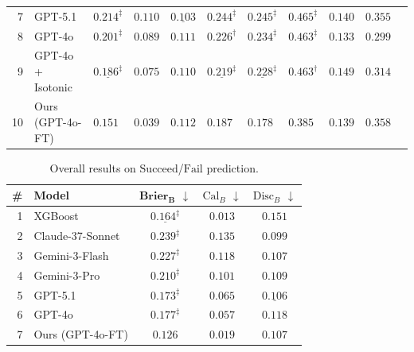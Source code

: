 \documentclass{article}
\theoremstyle{plain}
\theoremstyle{definition}
\theoremstyle{remark}
\newcommand{\Succeed}{\boldsymbol{\mathrm{Succeed}}}
\newcommand{\Fail}{\boldsymbol{\mathrm{Fail}}}
\begin{document}
\begin{table}[t]
\begin{tabularx}{\textwidth}{@{} r X lllllllcc @{}}
7 & GPT-5.1 & $0.214^{\ddagger}$ & $0.110$ & $\underline{0.103}$ & $0.244^{\ddagger}$ & $0.245^{\ddagger}$ & $0.465^{\ddagger}$ & $0.140$ & $0.355$ \\
8 & GPT-4o & $0.201^{\ddagger}$ & $0.089$ & $0.111$ & ${0.226^{\dagger}}$ & ${0.234^{\ddagger}}$ & $0.463^{\ddagger}$ & $0.133$ & $0.299$ \\
9 & GPT-4o + Isotonic & $\underline{0.186^{\ddagger}}$ & $0.075$ & $0.110$ & $\underline{0.219^{\ddagger}}$ & $\underline{0.228^{\ddagger}}$ & $0.463^{\dagger}$ & $0.149$ & $0.314$ \\
10 & Ours (GPT-4o-FT) & $\mathbf{0.151}$ & $0.039$ & $0.112$ & $\mathbf{0.187}$ & $\mathbf{0.178}$ & $\mathbf{0.385}$ & $0.139$ & $0.358$ \\

\bottomrule

\end{tabularx}
\end{table}

\begin{table}[t]
\caption{Overall results on $\Succeed$/$\Fail$ prediction.}
\label{tab:evaluation-metrics-completion}
\centering
\small
\begin{tabularx}{\columnwidth}{@{} r X ccc @{}}
\toprule
\textbf{\#}  & \textbf{Model}  & $\mathbf{Brier_B}$ $\downarrow$  & $\text{Cal}_B$ $\downarrow$  & $\text{Disc}_B$ $\downarrow$ \\
\midrule
1 & XGBoost             & $\underline{0.164^{\ddagger}}$ & $\mathbf{0.013}$ & $0.151$         \\
2 & Claude-37-Sonnet    & $0.239^{\ddagger}$             & $0.135$       & $\mathbf{0.099}$   \\
3 & Gemini-3-Flash      & $0.227^{\ddagger}$             & $0.118$       & $0.107$            \\
4 & Gemini-3-Pro        & $0.210^{\ddagger}$             & $0.101$       & $0.109$            \\
5 & GPT-5.1             & $0.173^{\ddagger}$             & $0.065$       & $\underline{0.106}$ \\
6 & GPT-4o              & $0.177^{\ddagger}$             & $0.057$       & $0.118$            \\
7 & Ours (GPT-4o-FT)    & $\mathbf{0.126}$               & $0.019$       & $0.107$            \\
\bottomrule
\end{tabularx}
\end{table}
\end{document}
